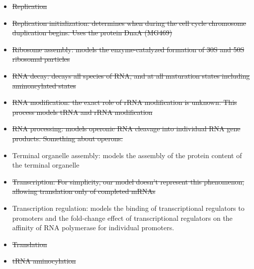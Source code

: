 \begin{itemize}
  \item \sout{Replication}
  \item \sout{Replication initialization: determines when during the cell cycle chromosome duplication begins. Uses the protein DnaA (MG469)}
  \item \sout{Ribosome assembly:  models the enzyme-catalyzed formation of 30S and 50S ribosomal particles}
  \item \sout{RNA decay: decays all species of RNA, and at all maturation states including aminoacylated states}
  \item \sout{RNA modification: the exact role of rRNA modification is unknown. This process models tRNA and rRNA modification}
  \item \sout{RNA processing:  models operonic RNA cleavage into individual RNA gene products. Something about operons.}
  \item Terminal organelle assembly: models the assembly of the protein content of the terminal organelle
  \item \sout{Transcription: For simplicity, our model doesn’t represent this phenomenon, allowing translation only of completed mRNAs}
  \item Transcription regulation: models the binding of transcriptional regulators to promoters and the fold-change effect of transcriptional regulators on the affinity of RNA polymerase for individual promoters.
  \item \sout{Translation}
  \item \sout{tRNA aminocylation}
\end{itemize}